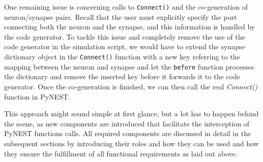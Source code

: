 One remaining issue is concerning calls to \texttt{Connect()} and the co-generation of neuron/synapse pairs. Recall that the user must explicitly specify the port connecting both the neuron and the synapse, and this information is handled by the code generator. To tackle this issue and completely remove the use of the code generator in the simulation script, we would have to extend the synapse dictionary object in the \texttt{Connect()} function with a new key referring to the mapping between the neuron and synapse and let the \texttt{before} function processes the dictionary and remove the inserted key before it forwards it to the code generator. Once the co-generation is finished, we can then call the real \emph{Connect()} function in PyNEST.

This approach might sound simple at first glance, but a lot has to happen behind the scene, as new components are introduced that facilitate the interception of PyNEST functions calls. All required components are discussed in detail in the subsequent sections by introducing their roles and how they can be used and how they ensure the fulfillment of all functional requirements as laid out above.


